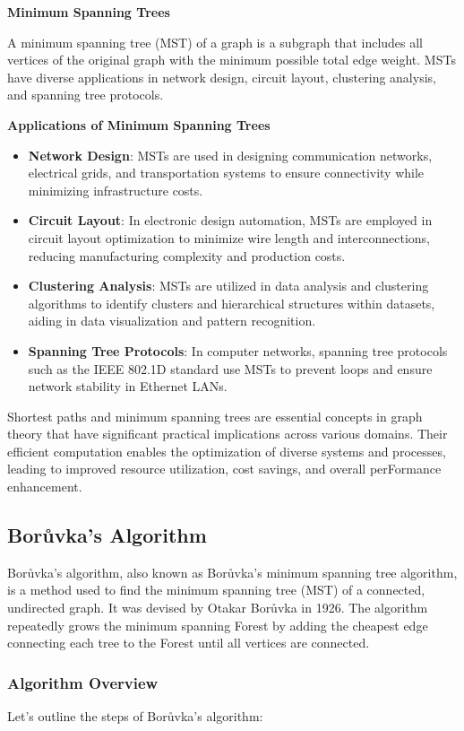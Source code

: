 \documentclass[12pt]{book} %
\begin{document}
\textbf{Minimum Spanning Trees}

A minimum spanning tree (MST) of a graph is a subgraph that includes all vertices of the original graph with the minimum possible total edge weight. MSTs have diverse applications in network design, circuit layout, clustering analysis, and spanning tree protocols.

\textbf{Applications of Minimum Spanning Trees}

\begin{itemize}
    \item \textbf{Network Design}: MSTs are used in designing communication networks, electrical grids, and transportation systems to ensure connectivity while minimizing infrastructure costs.
    \item \textbf{Circuit Layout}: In electronic design automation, MSTs are employed in circuit layout optimization to minimize wire length and interconnections, reducing manufacturing complexity and production costs.
    \item \textbf{Clustering Analysis}: MSTs are utilized in data analysis and clustering algorithms to identify clusters and hierarchical structures within datasets, aiding in data visualization and pattern recognition.
    \item \textbf{Spanning Tree Protocols}: In computer networks, spanning tree protocols such as the IEEE 802.1D standard use MSTs to prevent loops and ensure network stability in Ethernet LANs.
\end{itemize}

Shortest paths and minimum spanning trees are essential concepts in graph theory that have significant practical implications across various domains. Their efficient computation enables the optimization of diverse systems and processes, leading to improved resource utilization, cost savings, and overall perFormance enhancement.

\subsection{Borůvka's Algorithm}
Borůvka's algorithm, also known as Borůvka's minimum spanning tree algorithm, is a method used to find the minimum spanning tree (MST) of a connected, undirected graph. It was devised by Otakar Borůvka in 1926. The algorithm repeatedly grows the minimum spanning Forest by adding the cheapest edge connecting each tree to the Forest until all vertices are connected.
\subsubsection{Algorithm Overview}
Let's outline the steps of Borůvka's algorithm:
\end{document}
